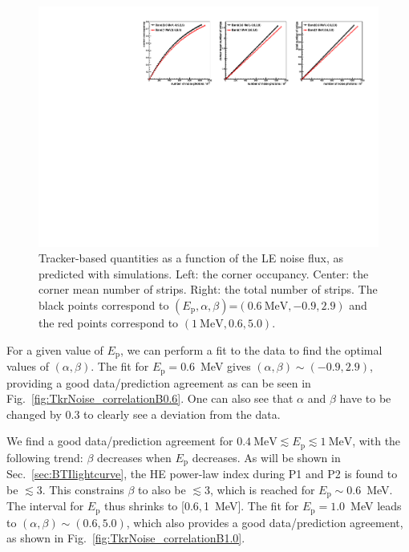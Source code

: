 \documentclass[preprint]{aastex631}
\begin{document}
\begin{figure}[t]
    \centering
    \includegraphics[width=0.9\linewidth]{paper_showSimuTkrNoiseInCorner.pdf}
    \caption{Tracker-based quantities as a function of the LE noise flux, as predicted with simulations. Left: the corner occupancy. Center: the corner mean number of strips. Right: the total number of strips. The black points correspond to $(E_\mathrm{p},\alpha,\beta)$=$(0.6~\mathrm{MeV},-0.9,2.9)$ and the red points correspond to $(1~\mathrm{MeV},0.6,5.0)$. }
    \label{fig:SimTkrNoise}
\end{figure}

For a given value of $E_\mathrm{p}$, we can perform a fit to the data to find the optimal values of $(\alpha,\beta)$. The fit for $E_\mathrm{p}=0.6$~MeV gives $(\alpha,\beta) \sim (-0.9,2.9)$, providing a good data/prediction agreement as can be seen in Fig.~\ref{fig:TkrNoise_correlationB0.6}. One can also see that $\alpha$ and $\beta$ have to be changed by 0.3 to clearly see a deviation from the data.

We find a good data/prediction agreement for $0.4~\mathrm{MeV} \lesssim E_\mathrm{p} \lesssim 1~\mathrm{MeV}$, with the following trend: $\beta$ decreases when $E_\mathrm{p}$ decreases. As will be shown in Sec.~\ref{sec:BTIlightcurve}, the HE power-law index during P1 and P2 is found to be $\lesssim 3$. This constrains $\beta$ to also be $\lesssim 3$, which is reached for $E_\mathrm{p} \sim 0.6$~MeV. The interval for $E_\mathrm{p}$ thus shrinks to [0.6,\,1~MeV]. The fit for $E_\mathrm{p}=1.0$~MeV leads to $(\alpha,\beta) \sim (0.6,5.0)$, which also provides a good data/prediction agreement, as shown in Fig.~\ref{fig:TkrNoise_correlationB1.0}.
\end{document}
